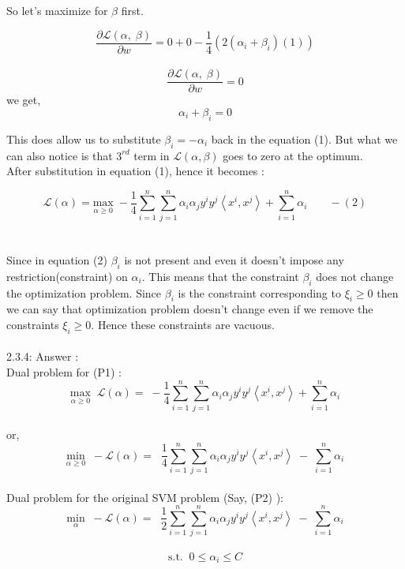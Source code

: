 \documentclass[a4paper,11pt]{article}
\begin{document}
\begin{mlsolution}
So let's maximize for $\beta$ first.

\[
\frac{\partial \mathcal{L}\left ( \alpha,\; \beta  \right ) }{\partial w} = 0 + 0 -\frac{1}{4}\left ( 2(\alpha_{i} + \beta_{i})(1) \right ) \] \\

\; \[\frac{\partial \mathcal{L}\left ( \alpha,\; \beta  \right ) }{\partial w} = 0
\]
we get,
\[
\alpha_{i} + \beta_{i} = 0
\]

This does allow us to substitute $\beta_{i} = - \alpha_{i}$ back in the equation (1). But what we can also notice is that $3^{rd}$ term in $\mathcal{L}(\alpha, \beta)$ goes to zero at the optimum.\\

After substitution in equation (1), hence it becomes :

\[
  \mathcal{L}\left ( \alpha \right ) = \underset{\alpha\geq 0}{\text{max}} \; -\frac{1}{4}\sum_{i=1}^{n}\sum_{j=1}^{n}\alpha_{i}\alpha_{j}y^{i}y^{j}\left \langle x^{i}, x^{j} \right \rangle+ \sum_{i=1}^{n}\alpha_{i} \;\;\;\;\;\;\; - (2)
\]\\\\Since in equation (2) $\beta_{i}$ is not present and even it doesn't impose any restriction(constraint) on $\alpha_{i}$. This means that the constraint $\beta_{i}$ does not change the optimization problem. Since $\beta_{i}$ is the constraint corresponding to $\xi_{i} \geq 0$ then we can say that optimization problem doesn't change even if we remove the constraints $\xi_{i} \geq 0$. Hence these constraints are vacuous.\\\\
2.3.4: Answer :\\

Dual problem for (P1) :
\[
\underset{\alpha\geq 0}{\text{max}} \;\; \mathcal{L}\left ( \alpha \right ) =  \; -\frac{1}{4}\sum_{i=1}^{n}\sum_{j=1}^{n}\alpha_{i}\alpha_{j}y^{i}y^{j}\left \langle x^{i}, x^{j} \right \rangle+ \sum_{i=1}^{n}\alpha_{i}
\]\\
or,
\[
\underset{\alpha\geq 0}{\text{min}} \;\; - \mathcal{L}\left ( \alpha \right ) = \; \;\frac{1}{4}\sum_{i=1}^{n}\sum_{j=1}^{n}\alpha_{i}\alpha_{j}y^{i}y^{j}\left \langle x^{i}, x^{j} \right \rangle \;-\; \sum_{i=1}^{n}\alpha_{i}
\]\\

Dual problem for the original SVM problem (Say, (P2) ):\\
\[
\underset{\alpha}{\text{min}} \;\; - \mathcal{L}\left ( \alpha \right ) = \; \;\frac{1}{2}\sum_{i=1}^{n}\sum_{j=1}^{n}\alpha_{i}\alpha_{j}y^{i}y^{j}\left \langle x^{i}, x^{j} \right \rangle \;-\; \sum_{i=1}^{n}\alpha_{i}
\]\\
\[\text{s.t.} \;\;0 \leq \alpha_{i} \leq C\]


\end{mlsolution}
\end{document}
